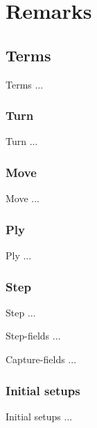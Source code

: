 
\chapter*{Remarks}

\section*{Terms}

Terms ...

\subsection*{Turn}
Turn ...

\subsection*{Move}
Move ...

\subsection*{Ply}
Ply ...

\subsection*{Step}
Step ...

Step-fields ...

Capture-fields ...

\subsection*{Initial setups}
Initial setups ...



